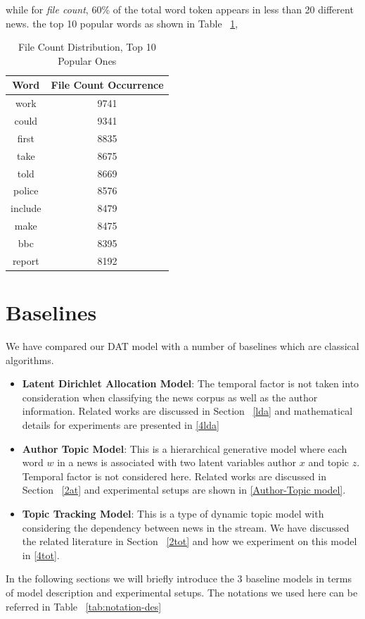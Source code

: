 while for \textit{file count}, 60\% of the total word token appears in less than 20 different news. the top 10 popular words as shown in Table ~\ref{filecount},

\begin{table}[h!]
\centering
 \begin{tabular}{||c c||} 
 \hline
 Word & File Count Occurrence \\ [0.5ex] 
 \hline\hline
work &	9741 \\
could &		9341\\
first &		8835\\
take &		8675\\
told &		8669\\
police	 &	8576\\
include	 &	8479\\
make &		8475\\
bbc	 &	8395\\
report	 &	8192\\ [1ex] 
 \hline
 \end{tabular}
 \caption{File Count Distribution, Top 10 Popular Ones}
 \label{filecount}
\end{table}


\section{Baselines}
We have compared our DAT model with a number of baselines which are classical algorithms. 
\begin{itemize}
    \item \textbf{Latent Dirichlet Allocation Model}: The temporal factor is not taken into consideration when classifying the news corpus as well as the author information. Related works are discussed in Section ~\ref{lda} and mathematical details for experiments are presented in \ref{4lda}
     \item \textbf{Author Topic Model}: This is a hierarchical generative model where each word
$w$ in a news is associated with two latent variables author $x$ and topic $z$. Temporal factor is not considered here. Related works are discussed in Section ~\ref{2at} and experimental setups are shown in \ref{Author-Topic model}.
      \item \textbf{Topic Tracking Model}: This is a type of dynamic topic model with considering the dependency between news in the stream. We have discussed the related literature in Section ~\ref{2tot} and how we experiment on this model in \ref{4tot}. 
\end{itemize}
In the following sections we will briefly introduce the 3 baseline models in terms of model description and experimental setups. The notations we used here can be referred in Table ~\ref{tab:notation-des}
